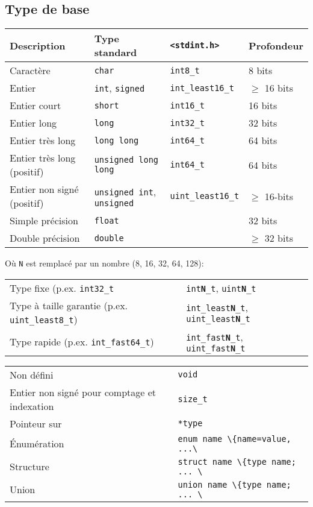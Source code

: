 \documentclass{article}
\newcommand{\cd}{\lstinline}
\begin{document}
\begin{multicols*}{3}
\subsection*{Type de base}
\begin{tabularx}{\linewidth}{X|l|l|l}
  \bf Description & \bf Type standard & \bf \texttt{<stdint.h>} & \bf Profondeur \\
  \hline
  Caractère                   & \cd{char}      & \cd {int8_t} & 8 bits \\
  \hline
  Entier                      & \cd{int}, \cd{signed}  & \cd {int_least16_t} & $\geq$ 16 bits \\
  Entier court                & \cd{short}     & \cd {int16_t} & 16 bits \\
  Entier long                 & \cd{long}      & \cd {int32_t} & 32 bits \\
  Entier très long            & \cd{long long} & \cd {int64_t} & 64 bits \\
  Entier très long (positif)  & \cd{unsigned long long} & \cd {int64_t} & 64 bits \\
  Entier non signé (positif)  & \cd{unsigned int}, \cd{unsigned} & \cd{uint_least16_t} & $\geq$ 16-bits \\
  \hline
  Simple précision            & \cd{float}     &  & 32 bits \\
  Double précision            & \cd{double}    &  & $\geq$ 32 bits \\
\end{tabularx}

Où \cd{N} est remplacé par un nombre (8, 16, 32, 64, 128):

\begin{tabularx}{\linewidth}{Xl}
  Type fixe (p.ex. \texttt{int32\_t} & \texttt{int\textbf{N}\_t}, \texttt{uint\textbf{N}\_t} \\
  Type à taille garantie (p.ex. \texttt{uint\_least8\_t}) & \texttt{int\_least\textbf{N}\_t}, \texttt{uint\_least\textbf{N}\_t} \\
  Type rapide (p.ex. \texttt{int\_fast64\_t}) & \texttt{int\_fast\textbf{N}\_t}, \texttt{uint\_fast\textbf{N}\_t} \\
\end{tabularx}

\begin{tabularx}{\linewidth}{Xl}
  Non défini                 & \cd{void} \\
  Entier non signé pour comptage et indexation & \cd{size_t} \\
  Pointeur sur                       & \cd{*type} \\
  Énumération                        & \cd{enum name \{name=value, ...\}}; \\
  Structure                          & \cd{struct name \{type name; ... \}}; \\
  Union                              & \cd{union name \{type name; ... \}}; \\
\end{tabularx}


\end{multicols*}
\end{document}

